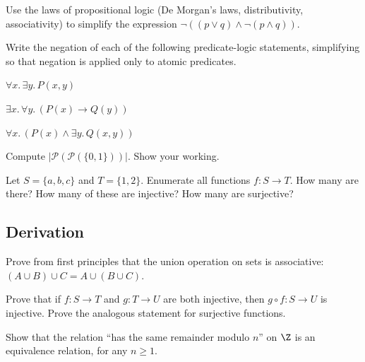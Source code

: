 \begin{exercise}
Use the laws of propositional logic (De Morgan's laws, distributivity, associativity) to simplify the expression $\lnot((p \vee q) \wedge \lnot(p \wedge q))$.
\end{exercise}

\begin{exercise}
Write the negation of each of the following predicate-logic statements, simplifying so that negation is applied only to atomic predicates.
\begin{enumerate*}[label=(\alph*)]
\item $\forall x.\, \exists y.\, P(x, y)$
\item $\exists x.\, \forall y.\, (P(x) \to Q(y))$
\item $\forall x.\, (P(x) \wedge \exists y.\, Q(x, y))$
\end{enumerate*}
\end{exercise}

\begin{exercise}
Compute $|\mathcal{P}(\mathcal{P}(\{0, 1\}))|$. Show your working.
\end{exercise}

\begin{exercise}
Let $S = \{a, b, c\}$ and $T = \{1, 2\}$. Enumerate all functions $f: S \to T$. How many are there? How many of these are injective? How many are surjective?
\end{exercise}

\subsection*{Derivation}

\begin{exercise}
Prove from first principles that the union operation on sets is associative: $(A \cup B) \cup C = A \cup (B \cup C)$.
\end{exercise}

\begin{exercise}
Prove that if $f: S \to T$ and $g: T \to U$ are both injective, then $g \circ f: S \to U$ is injective. Prove the analogous statement for surjective functions.
\end{exercise}

\begin{exercise}
Show that the relation ``has the same remainder modulo $n$'' on $\Z$ is an equivalence relation, for any $n \geq 1$.
\end{exercise}

